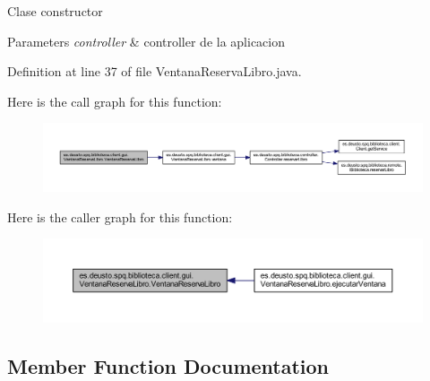 Clase constructor 
\begin{DoxyParams}{Parameters}
{\em controller} & controller de la aplicacion \\
\hline
\end{DoxyParams}


Definition at line 37 of file Ventana\+Reserva\+Libro.\+java.

Here is the call graph for this function\+:
\nopagebreak
\begin{figure}[H]
\begin{center}
\leavevmode
\includegraphics[width=350pt]{classes_1_1deusto_1_1spq_1_1biblioteca_1_1client_1_1gui_1_1_ventana_reserva_libro_a99e179051bda7281c34b0a4eaddbe78d_cgraph}
\end{center}
\end{figure}
Here is the caller graph for this function\+:
\nopagebreak
\begin{figure}[H]
\begin{center}
\leavevmode
\includegraphics[width=350pt]{classes_1_1deusto_1_1spq_1_1biblioteca_1_1client_1_1gui_1_1_ventana_reserva_libro_a99e179051bda7281c34b0a4eaddbe78d_icgraph}
\end{center}
\end{figure}


\subsection{Member Function Documentation}
\mbox{\label{classes_1_1deusto_1_1spq_1_1biblioteca_1_1client_1_1gui_1_1_ventana_reserva_libro_aed223a49195d685d15baf23d7bdd8469}} 

